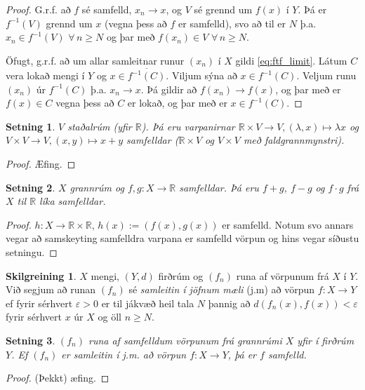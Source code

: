 \documentclass[a4paper,icelandic]{book}
\theoremstyle{definition}
\newtheorem{skilgr}{Skilgreining}[section]
\theoremstyle{plain}
\newtheorem{setn}{Setning}[section]
\theoremstyle{remark}
\newcommand{\R}{\mathbb{R}} %
\begin{document}
\begin{proof}
  G.r.f. að $f$ sé samfelld, $x_n\longrightarrow x$, og $V$ sé grennd um
  $f(x)$ í $Y$. Þá er $f^{-1}(V)$ grennd um $x$ (vegna þess að $f$ er samfelld),
  svo að til er $N$ þ.a. $x_n\in f^{-1}(V)$ $\forall\,n\geq N$ og þar með
  $f(x_n)\in V$ $\forall\,n\geq N$.

  Öfugt, g.r.f. að um allar samleitnar runur $(x_n)$ í $X$ gildi
  \eqref{eq:ftf_limit}. Látum $C$ vera lokað mengi í $Y$ og $x\in
  \overline{f^{-1}(C)}$. Viljum sýna að $x\in f^{-1}(C)$. Veljum runu $(x_n)$ úr
  $f^{-1}(C)$ þ.a. $x_n\longrightarrow x$. Þá gildir að $f(x_n)\longrightarrow
  f(x)$, og þar með er $f(x)\in C$ vegna þess að $C$ er lokað, og þar með er
  $x\in f^{-1}(C)$.
\end{proof}
\begin{setn}
  $V$ staðalrúm (yfir $\R$). Þá eru varpanirnar $\R\times V\to V,
  (\lambda,x)\mapsto \lambda x$ og $V\times V\to V, (x,y)\mapsto x+y$ samfelldar
  ($\R\times V$ og $V\times V$ með faldgrannmynstri).
\end{setn}
\begin{proof}
  Æfing.
\end{proof}
\begin{setn}
  $X$ grannrúm og $f,g:X\to\R$ samfelldar. Þá eru $f+g$, $f-g$ og $f\cdot g$ frá
  $X$ til $\R$ líka samfelldar.
\end{setn}
\begin{proof}
  $h:X\to\R\times\R$, $h(x) := (f(x),g(x))$ er samfelld. Notum svo annars vegar
  að samskeyting samfelldra varpana er samfelld vörpun og hins vegar síðustu
  setningu.
\end{proof}
\begin{skilgr}
  $X$ mengi, $(Y,d)$ firðrúm og $(f_n)$ runa af vörpunum frá $X$ í $Y$. Við
  segjum að runan $(f_n)$ sé \emph{samleitin í jöfnum mæli} (j.m) að vörpun $f:X\to Y$ ef fyrir sérhvert $\varepsilon > 0$ er
  til jákvæð heil tala $N$ þannig að $d(f_n(x),f(x))<\varepsilon$ fyrir sérhvert
  $x$ úr $X$ og öll $n\geq N$.
\end{skilgr}
\begin{setn}
  $(f_n)$ runa af samfelldum vörpunum frá grannrúmi $X$ yfir í firðrúm
  $Y$. Ef $(f_n)$ er samleitin í j.m. að vörpun $f:X\to Y$, þá er $f$ samfelld.
\end{setn}
\begin{proof}
  (Þekkt) æfing.
\end{proof}
\end{document}
